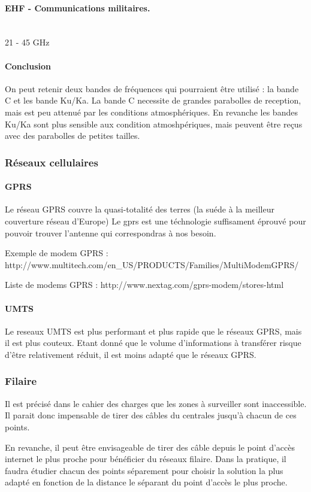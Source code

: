         \paragraph{EHF - Communications militaires.}\\
        21 - 45 GHz 
        
        \paragraph{Conclusion}
            On peut retenir deux bandes de fréquences qui pourraient être utilisé : la bande C et les bande Ku/Ka.
            La bande C necessite de grandes parabolles de reception, mais est peu attenué par les conditions atmosphériques.
            En revanche les bandes Ku/Ka sont plus sensible aux condition atmoshpériques, mais peuvent être reçus avec des parabolles de petites tailles.

    \subsubsection{Réseaux cellulaires}

            \paragraph{GPRS}
                Le réseau GPRS couvre la quasi-totalité des terres (la suéde à la meilleur couverture réseau d'Europe)
                Le gprs est une téchnologie suffisament éprouvé pour pouvoir trouver l'antenne qui correspondras à nos besoin.

                Exemple de modem GPRS :
                http://www.multitech.com/en_US/PRODUCTS/Families/MultiModemGPRS/

                Liste de modems GPRS :
                http://www.nextag.com/gprs-modem/stores-html

             \paragraph{UMTS}
                Le reseaux UMTS est plus performant et plus rapide que le réseaux GPRS, mais il est plus couteux.
                Etant donné que le volume d'informations à transférer risque d'être relativement réduit, il est moins adapté que le réseaux GPRS.
                
                
\subsubsection{Filaire}
        Il est précisé dans le cahier des charges que les zones à surveiller sont inaccessible.
        Il parait donc impensable de tirer des câbles du centrales jusqu'à chacun de ces points.

        En revanche, il peut être envisageable de tirer des câble depuis le point d'accès internet le plus proche pour bénéficier du réseaux filaire.
        Dans la pratique, il faudra étudier chacun des points séparement pour choisir la solution la plus adapté en fonction de la distance le séparant du point d'accès le plus proche.
